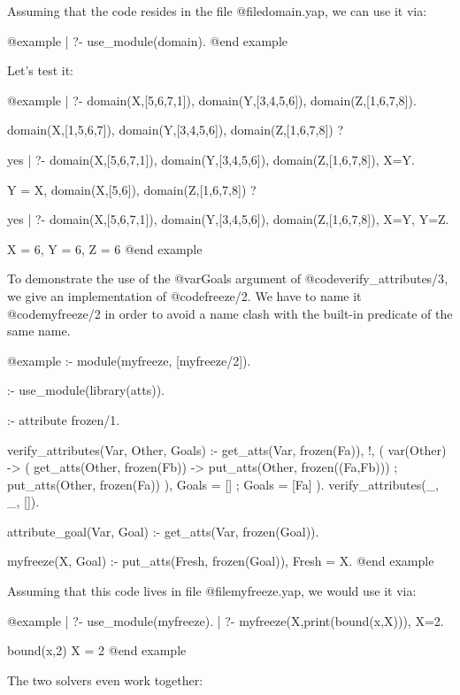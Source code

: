 {{{{{{{{{Assuming that the code resides in the file @file{domain.yap}, we
can use it via:

@example
| ?- use_module(domain).
@end example

Let's test it:

@example
| ?- domain(X,[5,6,7,1]), domain(Y,[3,4,5,6]), domain(Z,[1,6,7,8]).

domain(X,[1,5,6,7]),
domain(Y,[3,4,5,6]),
domain(Z,[1,6,7,8]) ? 

yes
| ?- domain(X,[5,6,7,1]), domain(Y,[3,4,5,6]), domain(Z,[1,6,7,8]), 
     X=Y.

Y = X,
domain(X,[5,6]),
domain(Z,[1,6,7,8]) ? 

yes
| ?- domain(X,[5,6,7,1]), domain(Y,[3,4,5,6]), domain(Z,[1,6,7,8]),
     X=Y, Y=Z.

X = 6,
Y = 6,
Z = 6
@end example

To demonstrate the use of the @var{Goals} argument of
@code{verify_attributes/3}, we give an implementation of
@code{freeze/2}.  We have to name it @code{myfreeze/2} in order to
avoid a name clash with the built-in predicate of the same name.

@example
:- module(myfreeze, [myfreeze/2]).

:- use_module(library(atts)).

:- attribute frozen/1.

verify_attributes(Var, Other, Goals) :-
        get_atts(Var, frozen(Fa)), !,       %
        (   var(Other) ->                   %
            (   get_atts(Other, frozen(Fb)) %
            ->  put_atts(Other, frozen((Fa,Fb))) %
            ;   put_atts(Other, frozen(Fa)) %
            ),
            Goals = []
        ;   Goals = [Fa]
        ).
verify_attributes(_, _, []).

attribute_goal(Var, Goal) :-                %
        get_atts(Var, frozen(Goal)).

myfreeze(X, Goal) :-
        put_atts(Fresh, frozen(Goal)),
        Fresh = X.
@end example

Assuming that this code lives in file @file{myfreeze.yap},
we would use it via:

@example
| ?- use_module(myfreeze).
| ?- myfreeze(X,print(bound(x,X))), X=2.

bound(x,2)                      %
X = 2                           %
@end example

The two solvers even work together:

}}}}}}}}}
